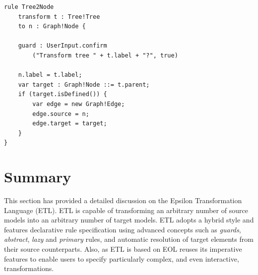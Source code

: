 \begin{lstlisting}[caption=Exemplar Interactive ETL Transformation, label=lst:InteractiveETLTransformationRule, language=ETL]
rule Tree2Node
	transform t : Tree!Tree
	to n : Graph!Node {
	
	guard : UserInput.confirm
		("Transform tree " + t.label + "?", true)
	
	n.label = t.label;
	var target : Graph!Node ::= t.parent;
	if (target.isDefined()) {
		var edge = new Graph!Edge;
		edge.source = n;
		edge.target = target;
	}
}
\end{lstlisting}

\section{Summary}

This section has provided a detailed discussion on the Epsilon Transformation Language (ETL). ETL is capable of transforming an arbitrary number of source models into an arbitrary number of target models. ETL adopts a hybrid style and features declarative rule specification using advanced concepts such as \emph{guards}, \emph{abstract}, \emph{lazy} and \emph{primary} rules, and automatic resolution of target elements from their source counterparts. Also, as ETL is based on EOL reuses its imperative features to enable users to specify particularly complex, and even interactive, transformations.